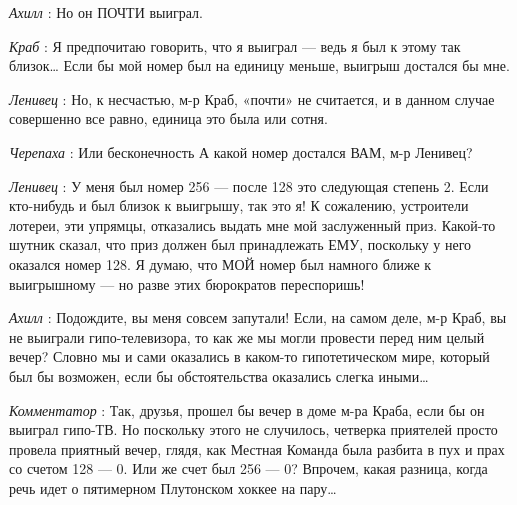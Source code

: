 \emph{Ахилл} : Но он ПОЧТИ выиграл.

\emph{Краб} : Я предпочитаю говорить, что я выиграл --- ведь я был к этому так близок\ldots{} Если бы мой номер был на единицу меньше, выигрыш достался бы мне.

\emph{Ленивец} : Но, к несчастью, м-р Краб, «почти» не считается, и в данном случае совершенно все равно, единица это была или сотня.

\emph{Черепаха} : Или бесконечность А какой номер достался ВАМ, м-р Ленивец?

\emph{Ленивец} : У меня был номер 256 --- после 128 это следующая степень 2. Если кто-нибудь и был близок к выигрышу, так это я! К сожалению, устроители лотереи, эти упрямцы, отказались выдать мне мой заслуженный приз. Какой-то шутник сказал, что приз должен был принадлежать ЕМУ, поскольку у него оказался номер 128. Я думаю, что МОЙ номер был намного ближе к выигрышному --- но разве этих бюрократов переспоришь!

\emph{Ахилл} : Подождите, вы меня совсем запутали! Если, на самом деле, м-р Краб, вы не выиграли гипо-телевизора, то как же мы могли провести перед ним целый вечер? Словно мы и сами оказались в каком-то гипотетическом мире, который был бы возможен, если бы обстоятельства оказались слегка иными\ldots{}

\emph{Комментатор} : Так, друзья, прошел бы вечер в доме м-ра Краба, если бы он выиграл гипо-ТВ. Но поскольку этого не случилось, четверка приятелей просто провела приятный вечер, глядя, как Местная Команда была разбита в пух и прах со счетом 128 --- 0. Или же счет был 256 --- 0? Впрочем, какая разница, когда речь идет о пятимерном Плутонском хоккее на пару\ldots{}

